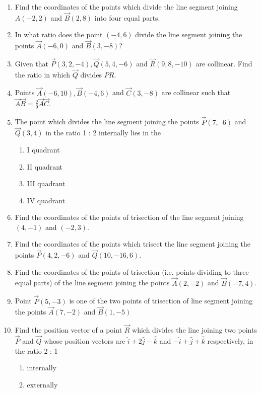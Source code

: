 \begin{enumerate}[label=\thesubsection.\arabic*,ref=\thesubsection.\theenumi]
\begin{enumerate}
		\solution
	
\item Find the coordinates of the points which divide the line segment joining $A(-2,2)$  and  $\vec{B}(2,8)$ into four equal parts.
	\\
		\solution
	
\item In what ratio does the point $(-4,6)$ divide the line segment joining the points $\vec{A}(-6,0)$ and $\vec{B}(3,-8)$?
\item Given that $\vec{P}(3,2,-4), \vec{Q}(5,4,-6)$ and $\vec{R}(9,8,-10)$ are collinear. Find the ratio in which $\vec{Q}$ divides $PR$.
\item Points $\vec{A}(-6,10),\vec{B}(-4,6)$  and  $\vec{C}(3,-8)$ are collinear such that $\vec{A}\vec{B}=  \frac{2}{9}\vec{A}\vec{C}$.
\item The point which divides the line segment joining the points $\vec{P} (7, –6) $  and  $\vec{Q}(3, 4)$ in the 
ratio 1 : 2 internally lies in the
\begin{enumerate}
\item I quadrant
\item  II quadrant
\item  III quadrant
\item  IV quadrant
\end{enumerate}
\item Find the coordinates of the points of trisection of the line segment joining $(4,-1)$  and  $(-2,3)$.
	\\
		\solution
	
\item Find the coordinates of the points which trisect the line segment joining the points $\vec{P}(4,2,-6)$ and $\vec{Q}(10,-16,6)$.
\item Find the coordinates of the points of trisection (i.e. points dividing to three equal parts) of the line segment joining the points $\vec{A}(2,-2)$ and $\vec{B}(-7,4)$.
\item Point $\vec{P}(5,-3)$ is one of the two points of trisection of line segment joining the points $\vec{A}(7,-2)$ and $\vec{B}(1,-5)$
\item Find the position vector of a point $\vec{R}$ which divides the line joining two points $\vec{P}$
and $\vec{Q}$ whose position vectors are $\hat{i}+2\hat{j}-\hat{k}$ and $-\hat{i}+\hat{j}+\hat{k}$ respectively, in the
ratio 2 : 1
\begin{enumerate}
    \item  internally
    \item  externally

\end{enumerate}
\end{enumerate}
\end{enumerate}
